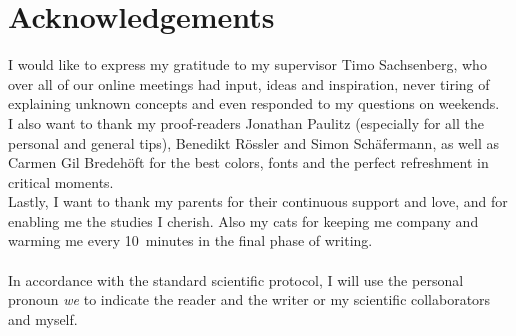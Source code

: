 \documentclass[twoside,12pt,a4paper]{report}
\begin{document}
\section*{Acknowledgements}
I would like to express my gratitude to my supervisor Timo Sachsenberg, who over all of our online meetings had input, ideas and inspiration, never tiring of explaining unknown concepts and even responded to my questions on weekends.\\
I also want to thank my proof-readers Jonathan Paulitz (especially for all the personal and general tips), Benedikt Rössler and Simon Schäfermann, as well as Carmen Gil Bredehöft for the best colors, fonts and the perfect refreshment in critical moments.\\
Lastly, I want to thank my parents for their continuous support and love, and for enabling me the studies I cherish. Also my cats for keeping me company and warming me every 10~minutes in the final phase of writing.\\
\vspace*{\fill}\\
In accordance with the standard scientific protocol, I will use the personal pronoun
\textit{we} to indicate the reader and the writer or my scientific collaborators and myself.
\cleardoublepage


\renewcommand{\baselinestretch}{1.3}
\small\normalsize

\tableofcontents

\renewcommand{\baselinestretch}{1}
\small\normalsize

\cleardoublepage


\renewcommand{\baselinestretch}{1.3}
\small\normalsize

\listoffigures

\renewcommand{\baselinestretch}{1}
\small\normalsize

\cleardoublepage

\end{document}
